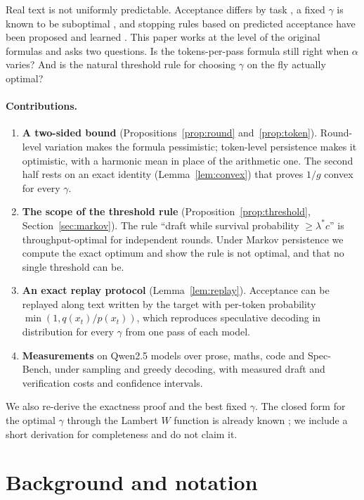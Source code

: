 \documentclass[10pt]{article}
\theoremstyle{remark}
\begin{document}
Real text is not uniformly predictable. Acceptance differs by task \cite{abdellatif}, a fixed $\gamma$ is known to be
suboptimal \cite{disco}, and stopping rules based on predicted acceptance have been proposed and learned
\cite{specdecpp,learningtodraft}. This paper works at the level of the original formulas and asks two questions. Is
the tokens-per-pass formula still right when $\alpha$ varies? And is the natural threshold rule for choosing $\gamma$
on the fly actually optimal?

\paragraph{Contributions.}
\begin{enumerate}\setlength{\itemsep}{0pt}
\item \textbf{A two-sided bound} (Propositions~\ref{prop:round} and~\ref{prop:token}). Round-level variation makes
the formula pessimistic; token-level persistence makes it optimistic, with a harmonic mean in place of the
arithmetic one. The second half rests on an exact identity (Lemma~\ref{lem:convex}) that proves $1/g$ convex for
every $\gamma$.
\item \textbf{The scope of the threshold rule} (Proposition~\ref{prop:threshold}, Section~\ref{sec:markov}). The rule
``draft while survival probability $\ge \lambda^* c$'' is throughput-optimal for independent rounds. Under Markov
persistence we compute the exact optimum and show the rule is not optimal, and that no single threshold can be.
\item \textbf{An exact replay protocol} (Lemma~\ref{lem:replay}). Acceptance can be replayed along text written by
the target with per-token probability $\min(1, q(x_t)/p(x_t))$, which reproduces speculative decoding in
distribution for every $\gamma$ from one pass of each model.
\item \textbf{Measurements} on Qwen2.5 models over prose, maths, code and Spec-Bench, under sampling and greedy
decoding, with measured draft and verification costs and confidence intervals.
\end{enumerate}
We also re-derive the exactness proof and the best fixed $\gamma$. The closed form for the optimal $\gamma$ through the
Lambert $W$ function is already known \cite{zheng,sdsl}; we include a short derivation for completeness and do not
claim it.

\section{Background and notation}
\end{document}
